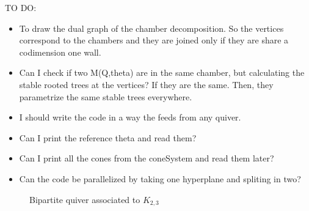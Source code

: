 \documentclass[11pt]{amsart}
\theoremstyle{plain}
\theoremstyle{definition}
\begin{document}
TO DO: 
\begin{itemize}
    \item To draw the dual graph of the chamber decomposition. So the vertices correspond to the chambers and they are joined only if they are share a codimension one wall.
    \item Can I check if two M(Q,theta) are in the same chamber, but calculating the stable rooted trees at the vertices? If they are the same. Then, they parametrize the same stable trees everywhere.
    \item I should write the code in a way the feeds from any quiver.
    \item Can I print the reference theta and read them?
    \item Can I print all the cones from the coneSystem and read them later?
    \item Can the code be parallelized by taking one hyperplane and spliting in two?
\end{itemize}


 
 


\begin{figure}[h!]
\caption{Bipartite quiver associated to $K_{2,3}$}
\label{fig:BipartiteQuiverK23}
\end{figure}
\end{document}
